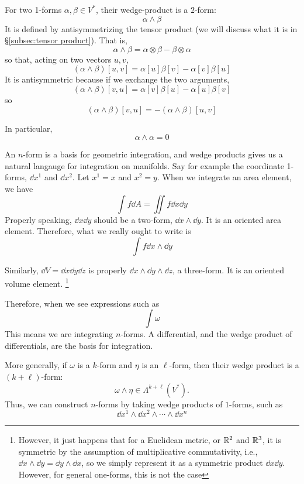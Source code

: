 		For two 1-forms $\alpha, \beta \in V^*$, their wedge-product is a $2$-form:
		\[
			\alpha \wedge \beta
		\]
		It is defined by antisymmetrizing the tensor product (we will discuss what it is in \S \ref{subsec:tensor product}). That is,
		\[
			\alpha\wedge\beta = \alpha\otimes\beta - \beta\otimes\alpha
		\]
		so that, acting on two vectors $u, v$,
		\[
			(\alpha \wedge \beta)[u,v] = \alpha[u]\beta[v]-\alpha[v]\beta[u]
		\]
		It is antisymmetric because if we exchange the two arguments,
		\[
			(\alpha \wedge \beta)[v,u] = \alpha[v]\beta[u]-\alpha[u]\beta[v]
		\]
		so
		\[
			(\alpha \wedge \beta)[v,u] = - (\alpha\wedge\beta)[u,v]
		\]

		In particular, 
		\begin{equation}
			\label{eq:self-wedge}
			\alpha\wedge\alpha = 0
		\end{equation}

		An $n$-form is a basis for geometric integration, and wedge products gives us a natural
		langauge for integration on manifolds. Say for example the coordinate 1-forms, $\dd{x}^1$ and $\dd{x}^2$.
		Let $x^1 =x$ and $x^2 = y$. When we integrate an area element, we have
		\[
			\int f \dd{A} = \iint f \dd{x}\dd{y}
		\]
		Properly speaking, $\dd{x}\dd{y}$ should be a two-form, $\dd{x}\wedge\dd{y}$. It is an oriented area element. Therefore, what we really
		ought to write is
		\[
			\int f \dd{x}\wedge \dd{y}
		\]

		Similarly, $\dd{V} = \dd{x}\dd{y}\dd{z}$ is properly $\dd{x}\wedge\dd{y}\wedge\dd{z}$, a three-form. It is an oriented volume element.%
		\footnote{
			However, it just happens that for a Euclidean metric, or $\mathbb{R}^2$ and $\mathbb{R}^3$, it is symmetric by the assumption of multiplicative commutativity, i.e.,
			$\dd{x}\wedge \dd{y} = \dd{y}\wedge \dd{x}$, so we simply represent it as a symmetric product $\dd{x}\dd{y}$. However, for general one-forms, this 
			is not the case
		}

		Therefore, when we see expressions such as 
		\[
			\int\omega
		\]
		This means we are integrating $n$-forms. A differential, and the wedge product of 
		differentials, are the basis for integration.

		More generally, if $\omega$ is a $k$-form and $\eta$ is an $\ell$-form,
		then their wedge product is a $(k+\ell)$-form:
		\[
			\omega\wedge\eta\in\Lambda^{k+\ell}(V^*).
		\]
		Thus, we can construct $n$-forms by taking wedge products of $1$-forms,
		such as
		\[
			\dd{x}^1\wedge\dd{x}^2\wedge\cdots\wedge\dd{x}^n
		\]

